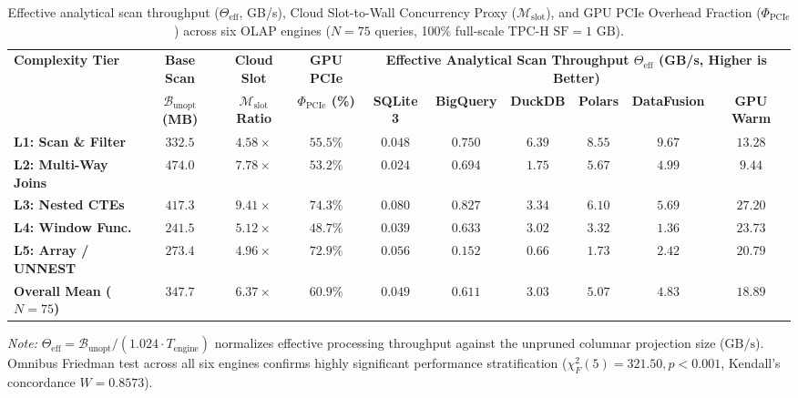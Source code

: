 \documentclass[10pt,a4paper]{article}
\newenvironment{fitasttable}{%
  \begin{lrbox}{\asttblbox}%
}{%
  \end{lrbox}%
  \sbox{\asttblboxB}{%
    \ifdim\wd\asttblbox>0.96\textwidth
      \resizebox{0.96\textwidth}{!}{\usebox{\asttblbox}}%
    \else
      \usebox{\asttblbox}%
    \fi
  }%
  \ifdim\ht\asttblboxB>0.78\textheight
    \resizebox{!}{0.78\textheight}{\usebox{\asttblboxB}}%
  \else
    \usebox{\asttblboxB}%
  \fi
}
\begin{document}
\begin{table}[!htbp]
\centering
\caption{Effective analytical scan throughput ($\Theta_{\text{eff}}$, GB/s), Cloud Slot-to-Wall Concurrency Proxy ($\mathcal{M}_{\text{slot}}$), and GPU PCIe Overhead Fraction ($\Phi_{\text{PCIe}}$) across six OLAP engines ($N=75$ queries, 100\% full-scale TPC-H $\text{SF}=1\text{ GB}$).}\label{tab:jbd_throughput_t6}
\label{tab:throughput_and_cost}
\renewcommand{\arraystretch}{1.20}
\begin{fitasttable}
\begin{tabular}{@{}lccccccccc@{}}
\toprule
\multirow{2}{*}{\textbf{Complexity Tier}} & \textbf{Base Scan} & \textbf{Cloud Slot} & \textbf{GPU PCIe} & \multicolumn{6}{c}{\textbf{Effective Analytical Scan Throughput $\Theta_{\text{eff}}$ (GB/s, Higher is Better)}} \\
\cmidrule(lr){5-10}
 & \textbf{$\mathcal{B}_{\text{unopt}}$ (MB)} & \textbf{$\mathcal{M}_{\text{slot}}$ Ratio} & \textbf{$\Phi_{\text{PCIe}}$ (\%)} & \textbf{SQLite 3} & \textbf{BigQuery} & \textbf{DuckDB} & \textbf{Polars} & \textbf{DataFusion} & \textbf{GPU Warm} \\
\midrule
\textbf{L1: Scan \& Filter} & $332.5$ & $4.58\times$ & $55.5\%$ & $0.048$ & $0.750$ & $6.39$ & $8.55$ & $\mathbf{9.67}$ & $\mathbf{13.28}$ \\
\textbf{L2: Multi-Way Joins} & $474.0$ & $7.78\times$ & $53.2\%$ & $0.024$ & $0.694$ & $1.75$ & $\mathbf{5.67}$ & $4.99$ & $\mathbf{9.44}$ \\
\textbf{L3: Nested CTEs} & $417.3$ & $\mathbf{9.41\times}$ & $74.3\%$ & $0.080$ & $0.827$ & $3.34$ & $\mathbf{6.10}$ & $5.69$ & $\mathbf{27.20}$ \\
\textbf{L4: Window Func.} & $241.5$ & $5.12\times$ & $\mathbf{48.7\%}$ & $0.039$ & $0.633$ & $3.02$ & $\mathbf{3.32}$ & $1.36$ & $\mathbf{23.73}$ \\
\textbf{L5: Array / UNNEST} & $273.4$ & $4.96\times$ & $72.9\%$ & $0.056$ & $0.152$ & $0.66$ & $1.73$ & $\mathbf{2.42}$ & $\mathbf{20.79}$ \\
\midrule
\textbf{Overall Mean ($N=75$)} & $\mathbf{347.7}$ & $\mathbf{6.37\times}$ & $\mathbf{60.9\%}$ & $\mathbf{0.049}$ & $\mathbf{0.611}$ & $\mathbf{3.03}$ & $\mathbf{5.07}$ & $\mathbf{4.83}$ & $\mathbf{18.89}$ \\
\bottomrule
\end{tabular}
\end{fitasttable}%
\vspace{2pt}
\parbox{0.96\textwidth}{\scriptsize \textit{Note:} $\Theta_{\text{eff}} = \mathcal{B}_{\text{unopt}} / (1.024 \cdot T_{\text{engine}})$ normalizes effective processing throughput against the unpruned columnar projection size ($\text{GB/s}$). Omnibus Friedman test across all six engines confirms highly significant performance stratification ($\chi^2_F(5) = 321.50, p < 0.001$, Kendall's concordance $W = 0.8573$).}
\end{table}
\end{document}
